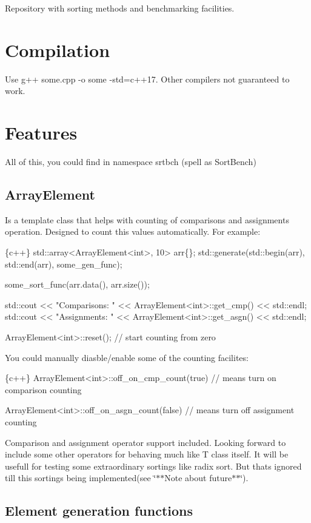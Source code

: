 Repository with sorting methods and benchmarking facilities.

\section*{Compilation}

Use {\ttfamily g++ some.\+cpp -\/o some -\/std=c++17}. Other compilers not guaranteed to work. \section*{Features}

All of this, you could find in namespace {\ttfamily srtbch} (spell as Sort\+Bench) \subsection*{Array\+Element}

Is a template class that helps with counting of comparisons and assignments operation. Designed to count this values automatically. For example\+: 
\begin{DoxyCode}
\{c++\}
std::array<ArrayElement<int>, 10> arr\{\};
std::generate(std::begin(arr), std::end(arr), some\_gen\_func);

some\_sort\_func(arr.data(), arr.size());

std::cout << "Comparisons: " << ArrayElement<int>::get\_cmp()  << std::endl;
std::cout << "Assignments: " << ArrayElement<int>::get\_asgn() << std::endl;

ArrayElement<int>::reset();
// start counting from zero
\end{DoxyCode}
 You could manually diasble/enable some of the counting facilites\+: 
\begin{DoxyCode}
\{c++\}
ArrayElement<int>::off\_on\_cmp\_count(true)   
// means turn on comparison counting

ArrayElement<int>::off\_on\_asgn\_count(false) 
// means turn off assignment counting
\end{DoxyCode}
 Comparison and assignment operator support included. Looking forward to include some other operators for behaving much like T class itself. It will be usefull for testing some extraordinary sortings like radix sort. But that\textquotesingle{}s ignored till this sortings being implemented(see \char`\"{}$\ast$$\ast$\+Note about future$\ast$$\ast$\char`\"{}). \subsection*{Element generation functions}

